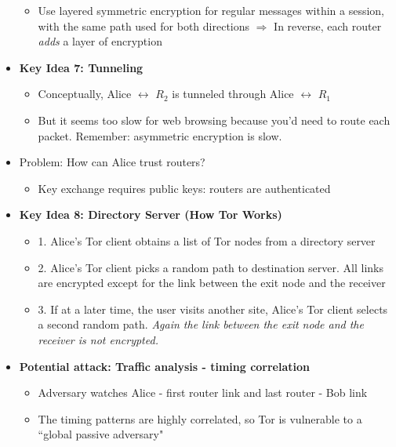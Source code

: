 \begin{itemize}
\begin{itemize}
                  \item Use layered symmetric encryption for regular messages within a session, with the same path used for both directions $\Rightarrow$ In reverse, each router {\it adds} a layer of encryption
              \end{itemize}
     \item {\bf Key Idea 7: Tunneling} \begin{itemize}
                  \item Conceptually, Alice $\leftrightarrow$ $R_2$ is tunneled through Alice $\leftrightarrow$ $R_1$
                  \item But it seems too slow for web browsing because you'd need to route each packet. Remember: asymmetric encryption is slow.
              \end{itemize}
     \item Problem: How can Alice trust routers?\begin{itemize}
                  \item Key exchange requires public keys: routers are authenticated
              \end{itemize}
     \item {\bf Key Idea 8: Directory Server (How Tor Works)} \begin{itemize}
                  \item{1.} Alice's Tor client obtains a list of Tor nodes from a directory server
                  \item{2.} Alice's Tor client picks a random path to destination server. All links are encrypted except for the link between the exit node and the receiver
                 \item{3.} If at a later time, the user visits another site, Alice's Tor client selects a second random path. {\it Again the link between the exit node and the receiver is not encrypted.}
              \end{itemize}
     \item {\bf Potential attack: Traffic analysis - timing correlation} \begin{itemize}
                  \item Adversary watches Alice - first router link and last router - Bob link
                  \item The timing patterns are highly correlated, so Tor is vulnerable to a ``global passive adversary"
              \end{itemize}
\end{itemize}

